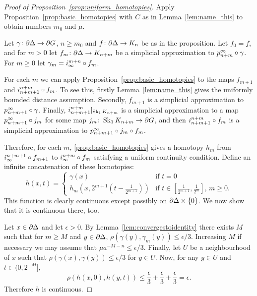 \documentclass[a4paper]{article}
\begin{document}
\begin{proof}[Proof of Proposition~\ref{prop:uniform_homotopies}]
  Apply Proposition~\ref{prop:basic_homotopies} with $C$ as in
  Lemma~\ref{lem:name_this} to obtain numbers $m_0$ and $\mu$.
  
  Let $\gamma\colon\partial\Delta\to\partial G$, $n\geq m_0$ and
  $f\colon\partial\Delta\to K_n$ be as in the proposition. Let $f_0 = f$,
  and for $m > 0$ let $f_m\colon\partial\Delta\to K_{n+m}$ be a
  simplicial approximation to $p^\infty_{n+m}\circ\gamma$. For $m \geq 0$
  let $\gamma_m = i^{m+n}_\infty\circ f_m$. 

  For each $m$ we can apply Proposition~\ref{prop:basic_homotopies} to the maps
  $f_{m+1}$ and $i^{n+m}_{n+m+1}\circ f_m$. To see this, firstly
  Lemma~\ref{lem:name_this} gives the uniformly bounded distance assumption.
  Secondly, $f_{m+1}$ is a simplicial approximation to
  $p^\infty_{n+m+1}\circ\gamma$. Finally,
  $i^{n+m}_{n+m+1}\vert_{\operatorname{Sk}_1 K_{n+m}}$ is a simplicial approximation
  to a map $p^\infty_{n+m+1}\circ j_m$ for some map $j_m\colon\operatorname{Sk}_1
  K_{n+m}\to \partial G$, and then $i^{n+m}_{n+m+1}\circ f_m$ is a
  simplicial approximation to $p^\infty_{n+m+1}\circ j_m\circ f_m$.
  
  Therefore, for each $m$, \cref{prop:basic_homotopies} gives a homotopy $h_m$
  from $i^{n+m+1}_\infty\circ f_{m+1}$ to $i^{n+m}_\infty \circ f_m$
  satisfying a uniform continuity condition. Define an infinite concatenation
  of these homotopies:
  \begin{equation*}
    h(x,t) = 
    \begin{cases}
      \gamma(x) & \text{if } t = 0\\
      h_m\left(x,2^{m+1}\left(t-\frac{1}{2^{m+1}}\right)\right) 
              & \text{if $t \in \left[\frac{1}{2^{m+1}}, \frac{1}{2^m}\right]$
                    , $m\geq 0$}.
    \end{cases}
  \end{equation*}
  This function is clearly continuous except possibly on
  $\partial\Delta\times\{0\}$. We now show that it is continuous there, too.

  Let $x \in \partial\Delta$ and let $\epsilon > 0$. By
  Lemma~\ref{lem:convergestoidentity} there exists $M$ such that for $m \geq M$
  and $y \in \partial \Delta$, $\rho(\gamma(y), \gamma_m(y)) \leq \epsilon/3$.
  Increasing $M$ if necessary we may assume that $\mu a^{-M-n} \leq
  \epsilon/3$.  Finally, let $U$ be a neighbourhood of $x$ such that
  $\rho(\gamma(x), \gamma(y)) \leq \epsilon/3$ for $y \in U$. Now, for any $y
  \in U$ and $t \in (0, 2^{-M}]$,
  \begin{equation*}
    \rho(h(x,0), h(y,t)) \leq \frac{\epsilon}{3} + \frac{\epsilon}{3} +
        \frac{\epsilon}{3} = \epsilon.
  \end{equation*}
  Therefore $h$ is continuous.


\end{proof}
\end{document}
